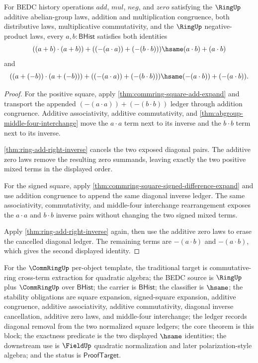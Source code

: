 \begin{theorem}
\label{thm:commring-square-cross-term-extraction-pair}
For BEDC history operations $add$, $mul$, $neg$, and $zero$ satisfying the
$\RingUp$ additive abelian-group laws, addition and multiplication congruence,
both distributive laws, multiplicative commutativity, and the $\RingUp$
negative-product laws, every $a,b : \mathsf{BHist}$ satisfies both identities
$$
((a+b)\cdot(a+b))+((-(a\cdot a))+(-(b\cdot b)))\hsame
(a\cdot b)+(a\cdot b)
$$
and
$$
((a+(-b))\cdot(a+(-b)))+((-(a\cdot a))+(-(b\cdot b)))\hsame
(-(a\cdot b))+(-(a\cdot b)).
$$
\end{theorem}
\begin{proof}
For the positive square, apply \autoref{thm:commring-square-add-expand} and
transport the appended $(-(a\cdot a))+(-(b\cdot b))$ ledger through addition
congruence. Additive associativity, additive commutativity, and
\autoref{thm:abgroup-middle-four-interchange} move the $a\cdot a$ term next to
its inverse and the $b\cdot b$ term next to its inverse.

\autoref{thm:ring-add-right-inverse} cancels the two exposed diagonal pairs.
The additive zero laws remove the resulting zero summands, leaving exactly the
two positive mixed terms in the displayed order.

For the signed square, apply
\autoref{thm:commring-square-signed-difference-expand} and use addition
congruence to append the same diagonal inverse ledger. The same associativity,
commutativity, and middle-four interchange rearrangement exposes the
$a\cdot a$ and $b\cdot b$ inverse pairs without changing the two signed mixed
terms.

Apply \autoref{thm:ring-add-right-inverse} again, then use the additive zero
laws to erase the cancelled diagonal ledger. The remaining terms are
$-(a\cdot b)$ and $-(a\cdot b)$, which gives the second displayed identity.
\end{proof}

For the $\CommRingUp$ per-object template, the traditional target is
commutative-ring cross-term extraction for quadratic algebra; the BEDC source is
$\RingUp$ plus $\CommRingUp$ over $\mathsf{BHist}$; the carrier is
$\mathsf{BHist}$; the classifier is $\hsame$; the stability obligations are
square expansion, signed-square expansion, additive congruence, additive
associativity, additive commutativity, diagonal inverse cancellation, additive
zero laws, and middle-four interchange; the ledger records diagonal removal from
the two normalized square ledgers; the core theorem is this block; the exactness
predicate is the two displayed $\hsame$ identities; the downstream use is
$\FieldUp$ quadratic normalization and later polarization-style algebra; and the
status is $\mathsf{ProofTarget}$.

